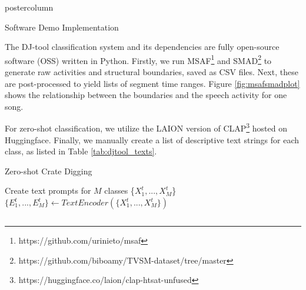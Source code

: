 \documentclass{beamer}
\begin{document}
\begin{frame}
\begin{columns}
\begin{column}{.43\textwidth}
\begin{beamercolorbox}[center]{postercolumn}
\begin{minipage}{.98\textwidth}
{%
					\begin{myblock}{Software Demo Implementation}
					
					The DJ-tool classification system and its dependencies are fully open-source software (OSS) written in Python. Firstly, we run MSAF\footnote{https://github.com/urinieto/msaf} and SMAD\footnote{https://github.com/biboamy/TVSM-dataset/tree/master} to generate raw activities and structural boundaries, saved as CSV files\cite{Hung2022, nieto2016systematic}. Next, these are post-processed to yield lists of segment time ranges. Figure \ref{fig:msafsmadplot} shows the relationship between the boundaries and the speech activity for one song. 
					
					\vspace{1.2em}
					For zero-shot classification, we utilize the LAION version of CLAP\footnote{https://huggingface.co/laion/clap-htsat-unfused} hosted on Huggingface\cite{elizalde2022claplearningaudioconcepts, WuClap2023}. Finally, we manually create a list of descriptive text strings for each class, as listed in Table \ref{tab:djtool_texts}.
					\vspace{1.2em}

			 \begin{algorithm}[H]
			 \vspace{0.2em}
			    \caption{Zero-shot Crate Digging}\label{combo_algo}
			    	Create text prompts for $M$ classes \{$X^{t}_{1},...,X^{t}_{M}$\} \\
			    	 $\{E^{t}_{1},...,E^{t}_{M}\} \gets TextEncoder(\{X^{t}_{1},...,X^{t}_{M}\})$ \\
					\BlankLine
			 \end{algorithm}
			\vspace{0.4em}
		  \end{myblock}\vfill
		}\end{minipage}\end{beamercolorbox}
	\end{column}
	

\end{columns}
\end{frame}
\end{document}
